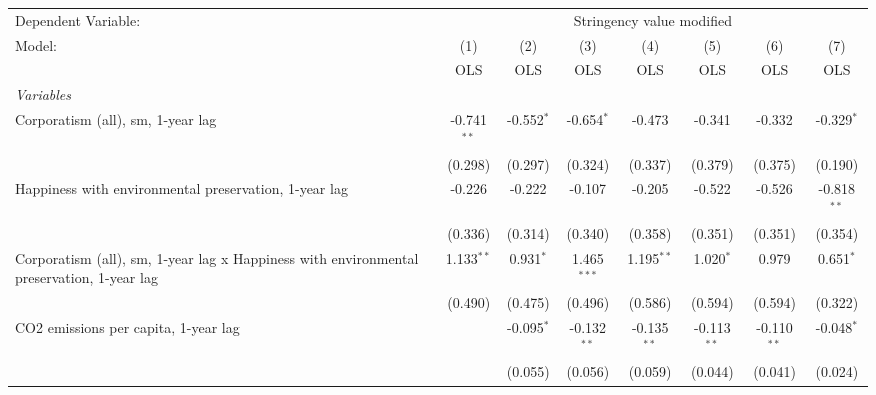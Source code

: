 
\begingroup
\centering
\begin{tabular}{lccccccc}
   \toprule
   Dependent Variable: & \multicolumn{7}{c}{Stringency value modified}\\
   Model:                                                                                    & (1)           & (2)          & (3)           & (4)           & (5)           & (6)           & (7)\\  
                                                                                             &  OLS          & OLS          & OLS           & OLS           & OLS           & OLS           & OLS\\  
   \midrule
   \emph{Variables}\\
   Corporatism (all), sm, 1-year lag                                                         & -0.741$^{**}$ & -0.552$^{*}$ & -0.654$^{*}$  & -0.473        & -0.341        & -0.332        & -0.329$^{*}$\\   
                                                                                             & (0.298)       & (0.297)      & (0.324)       & (0.337)       & (0.379)       & (0.375)       & (0.190)\\   
   Happiness with environmental preservation, 1-year lag                                     & -0.226        & -0.222       & -0.107        & -0.205        & -0.522        & -0.526        & -0.818$^{**}$\\   
                                                                                             & (0.336)       & (0.314)      & (0.340)       & (0.358)       & (0.351)       & (0.351)       & (0.354)\\   
   Corporatism (all), sm, 1-year lag x Happiness with environmental preservation, 1-year lag & 1.133$^{**}$  & 0.931$^{*}$  & 1.465$^{***}$ & 1.195$^{**}$  & 1.020$^{*}$   & 0.979         & 0.651$^{*}$\\   
                                                                                             & (0.490)       & (0.475)      & (0.496)       & (0.586)       & (0.594)       & (0.594)       & (0.322)\\   
   CO2 emissions per capita, 1-year lag                                                      &               & -0.095$^{*}$ & -0.132$^{**}$ & -0.135$^{**}$ & -0.113$^{**}$ & -0.110$^{**}$ & -0.048$^{*}$\\   
                                                                                             &               & (0.055)      & (0.056)       & (0.059)       & (0.044)       & (0.041)       & (0.024)\\   

\end{tabular}
